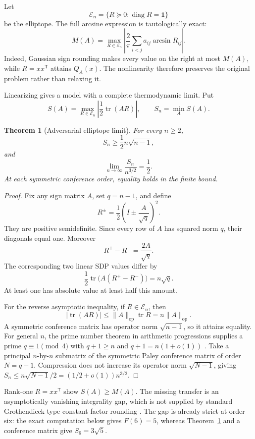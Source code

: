 \documentclass[11pt]{article}
\newtheorem{theorem}{Theorem}
\newcommand{\cE}{\mathcal E}
\DeclareMathOperator{\diag}{diag}
\DeclareMathOperator{\tr}{tr}
\begin{document}
Let
\[
 \cE_n=\{R\succeq0:\diag R=\mathbf1\}
\]
be the elliptope.  The full arcsine expression is tautologically exact:
\begin{equation}
 M(A)=\max_{R\in\cE_n}
 \left|\frac2\pi\sum_{i<j}a_{ij}\arcsin R_{ij}\right|.
 \label{eq:arcsineexact}
\end{equation}
Indeed, Gaussian sign rounding makes every value on the right at most
\(M(A)\), while \(R=xx^{\mathsf T}\) attains \(Q_A(x)\).  The nonlinearity
therefore preserves the original problem rather than relaxing it.

Linearizing gives a model with a complete thermodynamic limit.  Put
\[
 S(A)=\max_{R\in\cE_n}\left|\frac12\tr(AR)\right|,
 \qquad S_n=\min_A S(A).
\]

\begin{theorem}[Adversarial elliptope limit]
\label{thm:elliptope}
For every \(n\ge2\),
\[
 S_n\ge\frac12n\sqrt{n-1},
\]
and
\[
 \boxed{\displaystyle
 \lim_{n\to\infty}\frac{S_n}{n^{3/2}}=\frac12.}
\]
At each symmetric conference order, equality holds in the finite bound.
\end{theorem}

\begin{proof}
Fix any sign matrix \(A\), set \(q=n-1\), and define
\[
 R^\pm=\frac12\left(I\pm\frac A{\sqrt q}\right)^2.
\]
They are positive semidefinite.  Since every row of \(A\) has squared norm
\(q\), their diagonals equal one.  Moreover
\[
 R^+-R^-=\frac{2A}{\sqrt q}.
\]
The corresponding two linear SDP values differ by
\[
 \frac12\tr\bigl(A(R^+-R^-)\bigr)=n\sqrt q.
\]
At least one has absolute value at least half this amount.

For the reverse asymptotic inequality, if \(R\in\cE_n\), then
\[
 |\tr(AR)|\le\|A\|_{\mathrm{op}}\tr R=n\|A\|_{\mathrm{op}}.
\]
A symmetric conference matrix has operator norm \(\sqrt{n-1}\), so it
attains equality.  For general \(n\), the prime number theorem in arithmetic
progressions supplies a prime \(q\equiv1\pmod4\) with
\(q+1\ge n\) and \(q+1=n(1+o(1))\) \cite{davenport}.  Take a principal \(n\)-by-\(n\)
submatrix of the symmetric Paley conference matrix of order \(N=q+1\).
Compression does not increase its operator norm \(\sqrt{N-1}\), giving
\(S_n\le n\sqrt{N-1}/2=(1/2+o(1))n^{3/2}\).
\end{proof}

Rank-one \(R=xx^{\mathsf T}\) show \(S(A)\ge M(A)\).  The missing transfer is
an asymptotically vanishing integrality gap, which is not supplied by standard
Grothendieck-type constant-factor rounding \cite{alon-naor,nesterov}.  The gap
is already strict at order six: the exact computation below gives \(F(6)=5\),
whereas Theorem~\ref{thm:elliptope} and a conference matrix give
\(S_6=3\sqrt5\).
\end{document}
